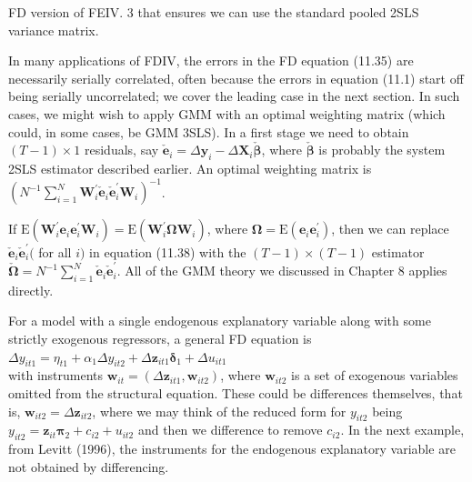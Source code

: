 \documentclass[10pt]{article}
\begin{document}
FD version of FEIV. 3 that ensures we can use the standard pooled 2SLS variance matrix.

In many applications of FDIV, the errors in the FD equation (11.35) are necessarily serially correlated, often because the errors in equation (11.1) start off being serially uncorrelated; we cover the leading case in the next section. In such cases, we might wish to apply GMM with an optimal weighting matrix (which could, in some cases, be GMM 3SLS). In a first stage we need to obtain $(T-1) \times 1$ residuals, say $\check{\mathbf{e}}_{i}=\Delta \mathbf{y}_{i}-\Delta \mathbf{X}_{i} \check{\boldsymbol{\beta}}$, where $\check{\boldsymbol{\beta}}$ is probably the system 2SLS estimator described earlier. An optimal weighting matrix is\\
$\left(N^{-1} \sum_{i=1}^{N} \mathbf{W}_{i}^{\prime} \check{\mathbf{e}}_{i} \check{\mathbf{e}}_{i}^{\prime} \mathbf{W}_{i}\right)^{-1}$.

If $\mathrm{E}\left(\mathbf{W}_{i}^{\prime} \mathbf{e}_{i} \mathbf{e}_{i}^{\prime} \mathbf{W}_{i}\right)=\mathrm{E}\left(\mathbf{W}_{i}^{\prime} \boldsymbol{\Omega} \mathbf{W}_{i}\right)$, where $\boldsymbol{\Omega}=\mathrm{E}\left(\mathbf{e}_{i} \mathbf{e}_{i}^{\prime}\right)$, then we can replace $\check{\mathbf{e}}_{i} \check{\mathbf{e}}_{i}^{\prime}($ for all $i)$ in equation (11.38) with the $(T-1) \times(T-1)$ estimator $\check{\boldsymbol{\Omega}}=N^{-1} \sum_{i=1}^{N} \check{\mathbf{e}}_{i} \check{\mathbf{e}}_{i}^{\prime}$. All of the GMM theory we discussed in Chapter 8 applies directly.

For a model with a single endogenous explanatory variable along with some strictly exogenous regressors, a general FD equation is\\
$\Delta y_{i t 1}=\eta_{t 1}+\alpha_{1} \Delta y_{i t 2}+\Delta \mathbf{z}_{i t 1} \boldsymbol{\delta}_{1}+\Delta u_{i t 1}$\\
with instruments $\mathbf{w}_{i t}=\left(\Delta \mathbf{z}_{i t 1}, \mathbf{w}_{i t 2}\right)$, where $\mathbf{w}_{i t 2}$ is a set of exogenous variables omitted from the structural equation. These could be differences themselves, that is, $\mathbf{w}_{i t 2}= \Delta \mathbf{z}_{i t 2}$, where we may think of the reduced form for $y_{i t 2}$ being $y_{i t 2}=\mathbf{z}_{i t} \boldsymbol{\pi}_{2}+c_{i 2}+u_{i t 2}$ and then we difference to remove $c_{i 2}$. In the next example, from Levitt (1996), the instruments for the endogenous explanatory variable are not obtained by differencing.
\end{document}
